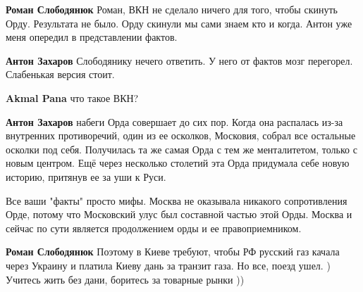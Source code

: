 \begin{itemize}
\begin{itemize}
\textbf{Роман Слободянюк} Роман, ВКН не сделало ничего для того, чтобы скинуть Орду. Результата не было. Орду скинули мы сами знаем кто и когда. Антон уже меня опередил в представлении фактов.

 
\textbf{Антон Захаров} Слободянику нечего ответить. У него от фактов мозг перегорел. Слабенькая версия стоит.

 
\textbf{Akmal Pana} что такое ВКН?

 
\textbf{Антон Захаров} набеги Орда совершает до сих пор. Когда она распалась из-за внутренних противоречий, один из ее осколков, Московия, собрал все остальные осколки под себя. Получилась та же самая Орда с тем же менталитетом, только с новым центром. Ещё через несколько столетий эта Орда придумала себе новую историю, притянув ее за уши к Руси.

 
Все ваши "факты" просто мифы. Москва не оказывала никакого сопротивления Орде, потому что Московский улус был составной частью этой Орды. Москва и сейчас по сути является продолжением орды и ее правоприемником.

 
\textbf{Роман Слободянюк} Поэтому в Киеве требуют, чтобы РФ русский газ качала через Украину и платила Киеву дань за транзит газа. Но все, поезд ушел. ) Учитесь жить без дани, боритесь за товарные рынки ))


\end{itemize}
\end{itemize}
